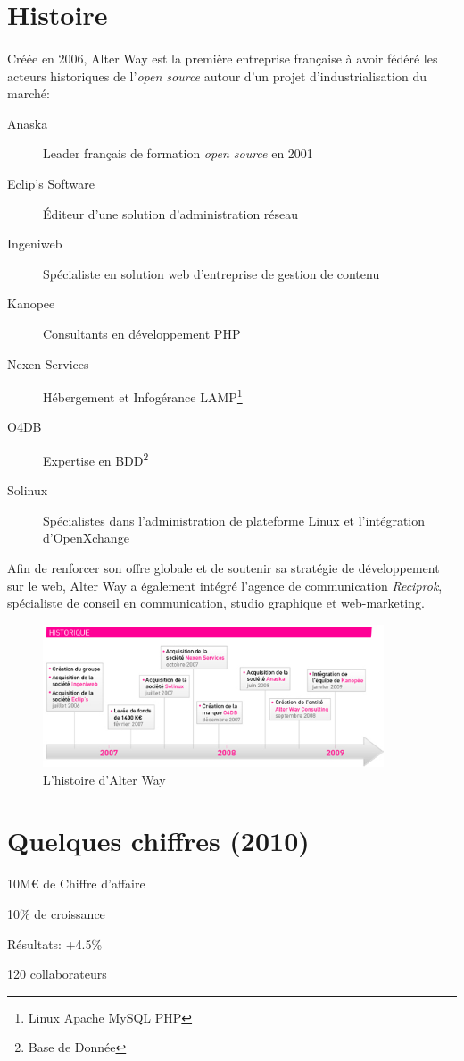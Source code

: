 \section{Histoire}
\paragraph*{}
	Créée en 2006, Alter Way est la première entreprise française à avoir fédéré les acteurs historiques
	de l'\emph{open source} autour d'un projet d'industrialisation du marché:

	\begin{description}
		\item[Anaska] Leader français de formation \emph{open source} en 2001
		\item[Eclip's Software] Éditeur d'une solution d'administration réseau
		\item[Ingeniweb] Spécialiste en solution web d'entreprise de gestion de contenu
		\item[Kanopee] Consultants en développement PHP
		\item[Nexen Services] Hébergement et Infogérance LAMP\footnote{Linux Apache MySQL PHP}
		\item[O4DB] Expertise en BDD\footnote{Base de Donnée}
		\item[Solinux] Spécialistes dans l'administration de plateforme Linux et l'intégration d'OpenXchange
	\end{description}

	Afin de renforcer son offre globale et de soutenir sa stratégie de développement sur le web, Alter Way
	a également intégré l'agence de communication \emph{Reciprok}, spécialiste de conseil en communication,
	studio graphique et web-marketing.

	\begin{figure}
		\centering
		\includegraphics[width=0.9\textwidth]{resource/img/historique_aw}
		\caption{L'histoire d'Alter Way}
	\end{figure}

\section{Quelques chiffres (2010)}
 \begin{listi}
		\item 10M\euro{} de Chiffre d'affaire
		\item 10\% de croissance
		\item Résultats: +4.5\%
		\item 120 collaborateurs
 \end{listi}

